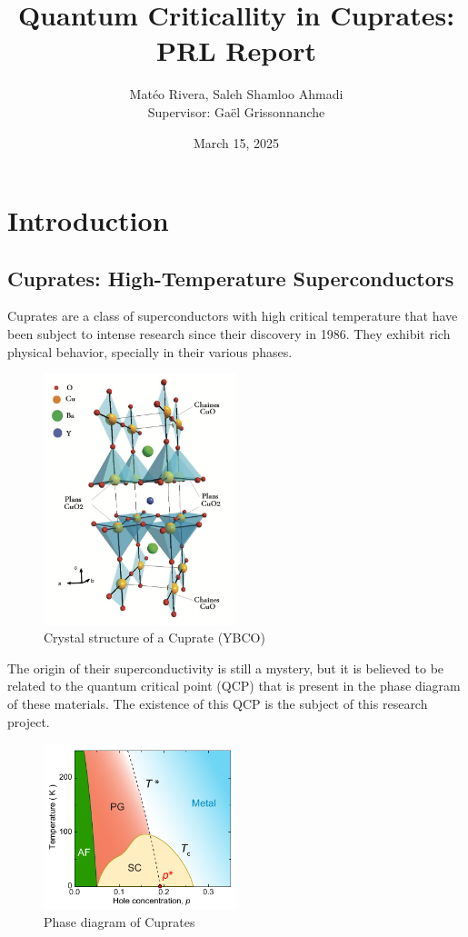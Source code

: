 \documentclass[12pt]{article}
\title{Quantum Criticallity in Cuprates: PRL Report}
\author{Matéo Rivera, Saleh Shamloo Ahmadi\\Supervisor: Gaël Grissonnanche}
\date{March 15, 2025}
\begin{document}
\maketitle
\begin{abstract}

\end{abstract}
\section{Introduction}
\subsection{Cuprates: High-Temperature Superconductors}
Cuprates are a class of superconductors with high critical temperature that have been subject
to intense research since their discovery in 1986. They exhibit rich physical behavior, specially
in their various phases.

\begin{figure}
    \centering
    \includegraphics[width=0.5\textwidth]{figures/cuprate_structure}
    \caption{Crystal structure of a Cuprate (YBCO)}
    \label{fig:cuprate_structure}
\end{figure}

The origin of their superconductivity is still a mystery, but it is believed to be related to the
quantum critical point (QCP) that is present in the phase diagram of these materials. The existence
of this QCP is the subject of this research project.

\begin{figure}
    \centering
    \includegraphics[width=0.5\textwidth]{figures/phase_diagram}
    \caption{Phase diagram of Cuprates}
    \label{fig:phase_diagram}
\end{figure}
\end{document}

